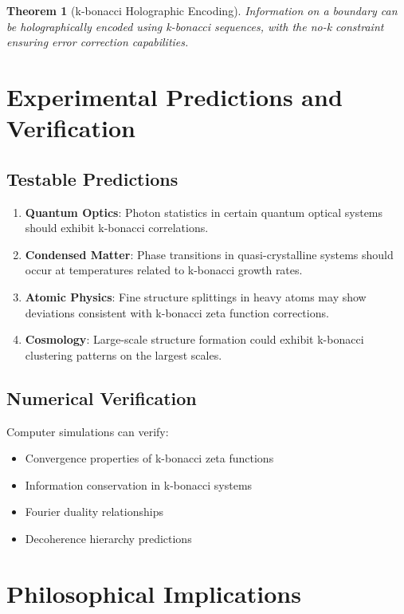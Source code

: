 \documentclass[12pt]{article}
\theoremstyle{plain}
\newtheorem{theorem}{Theorem}[section]
\theoremstyle{definition}
\begin{document}
\begin{theorem}[k-bonacci Holographic Encoding]
Information on a boundary can be holographically encoded using k-bonacci sequences, with the no-k constraint ensuring error correction capabilities.
\end{theorem}

\section{Experimental Predictions and Verification}

\subsection{Testable Predictions}

\begin{enumerate}
\item \textbf{Quantum Optics}: Photon statistics in certain quantum optical systems should exhibit k-bonacci correlations.

\item \textbf{Condensed Matter}: Phase transitions in quasi-crystalline systems should occur at temperatures related to k-bonacci growth rates.

\item \textbf{Atomic Physics}: Fine structure splittings in heavy atoms may show deviations consistent with k-bonacci zeta function corrections.

\item \textbf{Cosmology}: Large-scale structure formation could exhibit k-bonacci clustering patterns on the largest scales.
\end{enumerate}

\subsection{Numerical Verification}

Computer simulations can verify:
\begin{itemize}
\item Convergence properties of k-bonacci zeta functions
\item Information conservation in k-bonacci systems
\item Fourier duality relationships
\item Decoherence hierarchy predictions
\end{itemize}

\section{Philosophical Implications}
\end{document}
